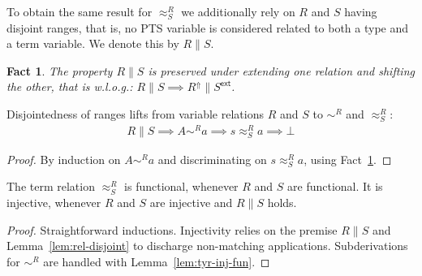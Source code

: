 \documentclass[a4paper,UKenglish]{lipics-v2016}
\newcommand{\tyr}{\mathrel{\sim}}
\newcommand{\tmr}{\mathrel{\approx}}
\newcommand{\Rext}[1]{\ensuremath{#1^{\mathsf{ext}}}}
\newcommand{\Rshift}[1]{\ensuremath{#1^{\Uparrow}}}
\theoremstyle{plain}
\newtheorem{fact}[theorem]{Fact}
\begin{document}
To obtain the same result for $\tmr^R_S$ we additionally rely on $R$ and $S$ having disjoint ranges, that is, no PTS variable is considered related to both a type and a term variable.
We denote this by $R \| S$.
\begin{fact}
  \label{fac:rel-disjoint}
  The property $R \| S$ is preserved under extending one relation and shifting the other, that is w.l.o.g.: $R \| S \implies \Rshift{R} \| \Rext{S}$.\hfill\qedsymbol
\end{fact}
\begin{lemma}
  \label{lem:rel-disjoint}
  Disjointedness of ranges lifts from variable relations $R$ and $S$ to $\tyr^R$ and $\tmr^R_S$:
  \begin{align*}
    R \| S \implies A \tyr^R a \implies s \tmr^R_S a \implies \bot
  \end{align*}
\end{lemma}
\begin{proof}
  By induction on $A \tyr^R a$ and discriminating on $s \tmr^R_S a$, using Fact~\ref{fac:rel-disjoint}.
\end{proof}
\begin{lemma}
  \label{lem:tmr-inj-fun}
  The term relation $\tmr^R_S$ is functional, whenever $R$ and $S$ are functional.
  It is injective, whenever $R$ and $S$ are injective and $R \| S$ holds.
\end{lemma}
\begin{proof}
  Straightforward inductions.
  Injectivity relies on the premise $R \| S$ and Lemma~\ref{lem:rel-disjoint} to discharge non-matching applications.
  Subderivations for $\tyr^R$ are handled with Lemma~\ref{lem:tyr-inj-fun}.
\end{proof}
\end{document}
